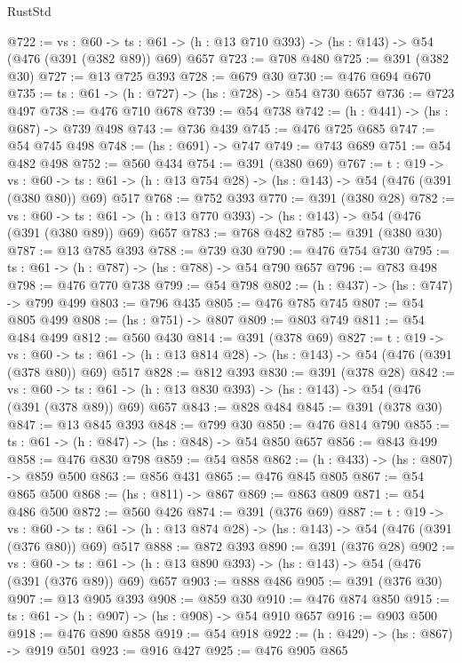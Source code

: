 \begin{lexlean}{RustStd}
\begin{coremodule}
@722 := {vs : @60} ->
  {ts : @61} -> (h : @13 @710 @393) -> (hs : @143) -> @54 (@476 (@391 (@382 @89)) @69) @657
@723 := @708 @480
@725 := @391 (@382 @30)
@727 := @13 @725 @393
@728 := @679 @30
@730 := @476 @694 @670
@735 := {ts : @61} -> (h : @727) -> (hs : @728) -> @54 @730 @657
@736 := @723 @497
@738 := @476 @710 @678
@739 := @54 @738
@742 := (h : @441) -> (hs : @687) -> @739 @498
@743 := @736 @439
@745 := @476 @725 @685
@747 := @54 @745 @498
@748 := (hs : @691) -> @747
@749 := @743 @689
@751 := @54 @482 @498
@752 := @560 @434
@754 := @391 (@380 @69)
@767 := {t : @19} ->
  {vs : @60} ->
  {ts : @61} -> (h : @13 @754 @28) -> (hs : @143) -> @54 (@476 (@391 (@380 @80)) @69) @517
@768 := @752 @393
@770 := @391 (@380 @28)
@782 := {vs : @60} ->
  {ts : @61} -> (h : @13 @770 @393) -> (hs : @143) -> @54 (@476 (@391 (@380 @89)) @69) @657
@783 := @768 @482
@785 := @391 (@380 @30)
@787 := @13 @785 @393
@788 := @739 @30
@790 := @476 @754 @730
@795 := {ts : @61} -> (h : @787) -> (hs : @788) -> @54 @790 @657
@796 := @783 @498
@798 := @476 @770 @738
@799 := @54 @798
@802 := (h : @437) -> (hs : @747) -> @799 @499
@803 := @796 @435
@805 := @476 @785 @745
@807 := @54 @805 @499
@808 := (hs : @751) -> @807
@809 := @803 @749
@811 := @54 @484 @499
@812 := @560 @430
@814 := @391 (@378 @69)
@827 := {t : @19} ->
  {vs : @60} ->
  {ts : @61} -> (h : @13 @814 @28) -> (hs : @143) -> @54 (@476 (@391 (@378 @80)) @69) @517
@828 := @812 @393
@830 := @391 (@378 @28)
@842 := {vs : @60} ->
  {ts : @61} -> (h : @13 @830 @393) -> (hs : @143) -> @54 (@476 (@391 (@378 @89)) @69) @657
@843 := @828 @484
@845 := @391 (@378 @30)
@847 := @13 @845 @393
@848 := @799 @30
@850 := @476 @814 @790
@855 := {ts : @61} -> (h : @847) -> (hs : @848) -> @54 @850 @657
@856 := @843 @499
@858 := @476 @830 @798
@859 := @54 @858
@862 := (h : @433) -> (hs : @807) -> @859 @500
@863 := @856 @431
@865 := @476 @845 @805
@867 := @54 @865 @500
@868 := (hs : @811) -> @867
@869 := @863 @809
@871 := @54 @486 @500
@872 := @560 @426
@874 := @391 (@376 @69)
@887 := {t : @19} ->
  {vs : @60} ->
  {ts : @61} -> (h : @13 @874 @28) -> (hs : @143) -> @54 (@476 (@391 (@376 @80)) @69) @517
@888 := @872 @393
@890 := @391 (@376 @28)
@902 := {vs : @60} ->
  {ts : @61} -> (h : @13 @890 @393) -> (hs : @143) -> @54 (@476 (@391 (@376 @89)) @69) @657
@903 := @888 @486
@905 := @391 (@376 @30)
@907 := @13 @905 @393
@908 := @859 @30
@910 := @476 @874 @850
@915 := {ts : @61} -> (h : @907) -> (hs : @908) -> @54 @910 @657
@916 := @903 @500
@918 := @476 @890 @858
@919 := @54 @918
@922 := (h : @429) -> (hs : @867) -> @919 @501
@923 := @916 @427
@925 := @476 @905 @865

\end{coremodule}
\end{lexlean}
